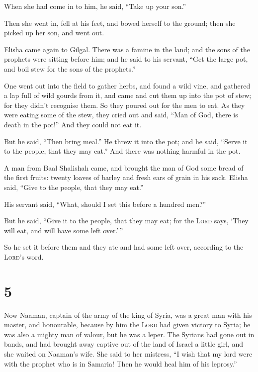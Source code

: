 When she had come in to him, he said, ``Take up your son.''

 Then she went in, fell at his feet, and bowed herself to
the ground; then she picked up her son, and went out.

 Elisha came again to Gilgal. There was a famine in the
land; and the sons of the prophets were sitting before him; and he said
to his servant, ``Get the large pot, and boil stew for the sons of the
prophets.''

 One went out into the field to gather herbs, and found a
wild vine, and gathered a lap full of wild gourds from it, and came and
cut them up into the pot of stew; for they didn't recognise them.
 So they poured out for the men to eat. As they were
eating some of the stew, they cried out and said, ``Man of God, there is
death in the pot!'' And they could not eat it.

 But he said, ``Then bring meal.'' He threw it into the
pot; and he said, ``Serve it to the people, that they may eat.'' And
there was nothing harmful in the pot.

 A man from Baal Shalishah came, and brought the man of
God some bread of the first fruits: twenty loaves of barley and fresh
ears of grain in his sack. Elisha said, ``Give to the people, that they
may eat.''

 His servant said, ``What, should I set this before a
hundred men?''

But he said, ``Give it to the people, that they may eat; for the
\textsc{Lord} says, `They will eat, and will have some left over.'\,''

 So he set it before them and they ate and had some left
over, according to the \textsc{Lord}'s word.

\hypertarget{section-4}{%
\section{5}\label{section-4}}

 Now Naaman, captain of the army of the king of Syria, was
a great man with his master, and honourable, because by him the
\textsc{Lord} had given victory to Syria; he was also a mighty man of
valour, but he was a leper.  The Syrians had gone out in
bands, and had brought away captive out of the land of Israel a little
girl, and she waited on Naaman's wife.  She said to her
mistress, ``I wish that my lord were with the prophet who is in Samaria!
Then he would heal him of his leprosy.''

